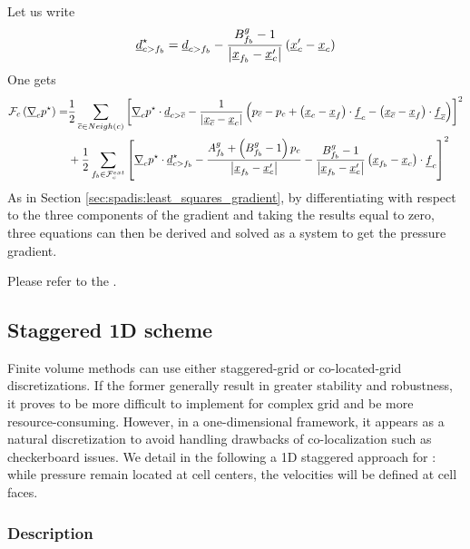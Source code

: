 Let us write
\begin{equation}
	\underline{d}_{{c>{{f}_{b}}}}^\star=\underline{d}_{{c>{{f}_{b}}}}-\frac{B^{g}_{{{f}_{b}}}-1}{\left| \underline{x}_{{{f}_{b}}}-\underline{x}_{c}^\prime \right|}\left(\underline{x}_{c}^\prime-{\underline{x}_{c}}\right)
\end{equation}
One gets
\begin{align*}
	\mathcal{F}_{c}\left(\underline{\nabla}_{c}{p^{\star}}\right)=
	&\frac{1}{2}\sum_{{\overline{c}} \in Neigh\left(c\right)}
	\left[
	\underline{\nabla}_{c}{p^\star}\cdot\underline{d}_{{c > {\overline{c}}}}-\frac{1}{\left| \underline{x}_{{\overline{c}}}-{\underline{x}_{c}} \right|}\left(p_{{\overline{c}}}-p_{c}+\left({\underline{x}_{c}}-\underline{x}_{{f}}\right)\cdot\underline{f}_{c}-\left(\underline{x}_{{\overline{c}}}-\underline{x}_{{f}}\right)\cdot\underline{f}_{{\overline{c}}}\right)
	\right]^2 \\
	&+\frac{1}{2}\sum_{{{f}_{b}} \in \mathcal{F}^{ext}_{c}}
	\left[
	\underline{\nabla}_{c}{p^\star}\cdot\underline{d}_{{c>{{f}_{b}}}}^\star-\frac{A^{g}_{{{f}_{b}}}+\left(B^{g}_{{{f}_{b}}}-1\right)p_{c}}{\left| \underline{x}_{{{f}_{b}}}-\underline{x}_{c}^\prime \right|}-\frac{B^{g}_{{{f}_{b}}}-1}{\left| \underline{x}_{{{f}_{b}}}-\underline{x}_{c}^\prime \right|}\left(\underline{x}_{{{f}_{b}}}-{\underline{x}_{c}}\right)\cdot\underline{f}_{c}
	\right]^2
\end{align*}
As in Section \ref{sec:spadis:least_squares_gradient}, by differentiating
with respect to the three components of the gradient and taking the
results equal to zero, three equations can then be derived and solved as
a system to get the pressure gradient.

Please refer to the .


\subsection{Staggered 1D scheme}

Finite volume methods can use either staggered-grid or co-located-grid
discretizations. If the former generally result in greater stability and
robustness, it proves to be more difficult to implement for complex grid and be
more resource-consuming. However, in a one-dimensional framework, it appears as
a natural discretization to avoid handling drawbacks of co-localization such as
checkerboard issues. We detail in the following a 1D staggered approach for
\CS: while pressure remain located at cell centers, the velocities will be
defined at cell faces.

\subsubsection{Description}

